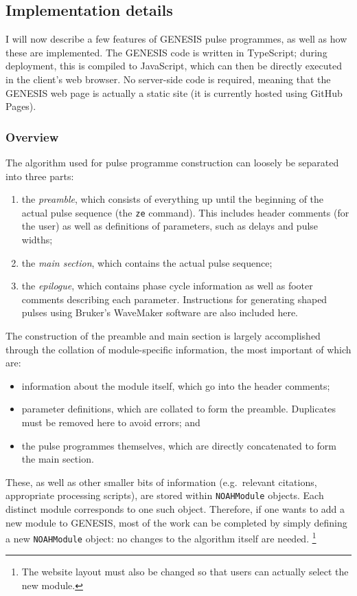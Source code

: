 \subsection{Implementation details}
\label{subsec:noah__genesis_implementation}

I will now describe a few features of GENESIS pulse programmes, as well as how these are implemented.
The GENESIS code is written in TypeScript; during deployment, this is compiled to JavaScript, which can then be directly executed in the client's web browser.
No server-side code is required, meaning that the GENESIS web page is actually a static site (it is currently hosted using GitHub Pages).

\subsubsection{Overview}

The algorithm used for pulse programme construction can loosely be separated into three parts:
\begin{enumerate}
    \item the \textit{preamble}, which consists of everything up until the beginning of the actual pulse sequence (the \texttt{ze} command). This includes header comments (for the user) as well as definitions of parameters, such as delays and pulse widths;
    \item the \textit{main section}, which contains the actual pulse sequence;
    \item the \textit{epilogue}, which contains phase cycle information as well as footer comments describing each parameter. Instructions for generating shaped pulses using Bruker's WaveMaker software are also included here.
\end{enumerate}


The construction of the preamble and main section is largely accomplished through the collation of module-specific information, the most important of which are:
\begin{itemize}
    \item information about the module itself, which go into the header comments;
    \item parameter definitions, which are collated to form the preamble. Duplicates must be removed here to avoid errors; and
    \item the pulse programmes themselves, which are directly concatenated to form the main section.
\end{itemize}
These, as well as other smaller bits of information (e.g.\ relevant citations, appropriate processing scripts), are stored within \texttt{NOAHModule} objects.
Each distinct module corresponds to one such object.
Therefore, if one wants to add a new module to GENESIS, most of the work can be completed by simply defining a new \texttt{NOAHModule} object: no changes to the algorithm itself are needed.%
\footnote{The website layout must also be changed so that users can actually select the new module.}

